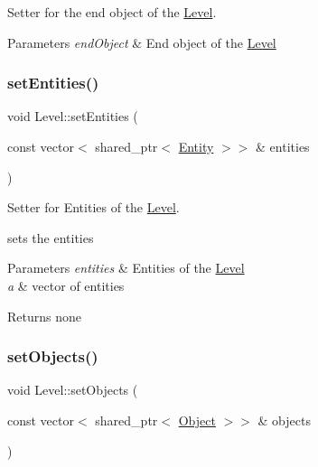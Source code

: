 Setter for the end object of the \hyperlink{classLevel}{Level}. 


\begin{DoxyParams}{Parameters}
{\em end\+Object} & End object of the \hyperlink{classLevel}{Level} \\
\hline
\end{DoxyParams}
\mbox{\label{classLevel_a24ca4848bfd4b00f02f677f12cda9fcf}} 
\subsubsection{\texorpdfstring{set\+Entities()}{setEntities()}}
{\footnotesize\ttfamily void Level\+::set\+Entities (\begin{DoxyParamCaption}\item[{const vector$<$ shared\+\_\+ptr$<$ \hyperlink{classEntity}{Entity} $>$$>$ \&}]{entities }\end{DoxyParamCaption})}



Setter for Entities of the \hyperlink{classLevel}{Level}. 

sets the entities


\begin{DoxyParams}{Parameters}
{\em entities} & Entities of the \hyperlink{classLevel}{Level}\\
\hline
{\em a} & vector of entities \\
\hline
\end{DoxyParams}
\begin{DoxyReturn}{Returns}
none 
\end{DoxyReturn}
\mbox{\label{classLevel_a82746a551f849962e642c288ab58b93c}} 
\subsubsection{\texorpdfstring{set\+Objects()}{setObjects()}}
{\footnotesize\ttfamily void Level\+::set\+Objects (\begin{DoxyParamCaption}\item[{const vector$<$ shared\+\_\+ptr$<$ \hyperlink{classObject}{Object} $>$$>$ \&}]{objects }\end{DoxyParamCaption})}



